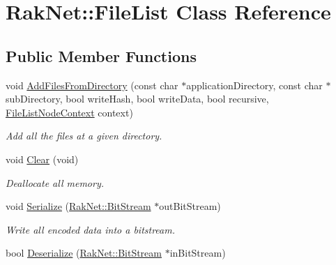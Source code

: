 \hypertarget{class_rak_net_1_1_file_list}{\section{Rak\-Net\-:\-:File\-List Class Reference}
\label{class_rak_net_1_1_file_list}
}
\subsection*{Public Member Functions}
\begin{DoxyCompactItemize}
\item 
void \hyperlink{class_rak_net_1_1_file_list_a9ff81c1d5fb8ad1897fd6b6b12108cf8}{Add\-Files\-From\-Directory} (const char $\ast$application\-Directory, const char $\ast$sub\-Directory, bool write\-Hash, bool write\-Data, bool recursive, \hyperlink{struct_file_list_node_context}{File\-List\-Node\-Context} context)
\begin{DoxyCompactList}\small\item\em Add all the files at a given directory. \end{DoxyCompactList}\item 
\hypertarget{class_rak_net_1_1_file_list_a0aaff64575ef83bf998d88cd8c5bd60e}{void \hyperlink{class_rak_net_1_1_file_list_a0aaff64575ef83bf998d88cd8c5bd60e}{Clear} (void)}\label{class_rak_net_1_1_file_list_a0aaff64575ef83bf998d88cd8c5bd60e}

\begin{DoxyCompactList}\small\item\em Deallocate all memory. \end{DoxyCompactList}\item 
\hypertarget{class_rak_net_1_1_file_list_a74b69189fbd89936926919d6de03974b}{void \hyperlink{class_rak_net_1_1_file_list_a74b69189fbd89936926919d6de03974b}{Serialize} (\hyperlink{class_rak_net_1_1_bit_stream}{Rak\-Net\-::\-Bit\-Stream} $\ast$out\-Bit\-Stream)}\label{class_rak_net_1_1_file_list_a74b69189fbd89936926919d6de03974b}

\begin{DoxyCompactList}\small\item\em Write all encoded data into a bitstream. \end{DoxyCompactList}\item 
\hypertarget{class_rak_net_1_1_file_list_ab801a3cd39d39996b75e3d4f18b64a13}{bool \hyperlink{class_rak_net_1_1_file_list_ab801a3cd39d39996b75e3d4f18b64a13}{Deserialize} (\hyperlink{class_rak_net_1_1_bit_stream}{Rak\-Net\-::\-Bit\-Stream} $\ast$in\-Bit\-Stream)}\label{class_rak_net_1_1_file_list_ab801a3cd39d39996b75e3d4f18b64a13}


\end{DoxyCompactItemize}
